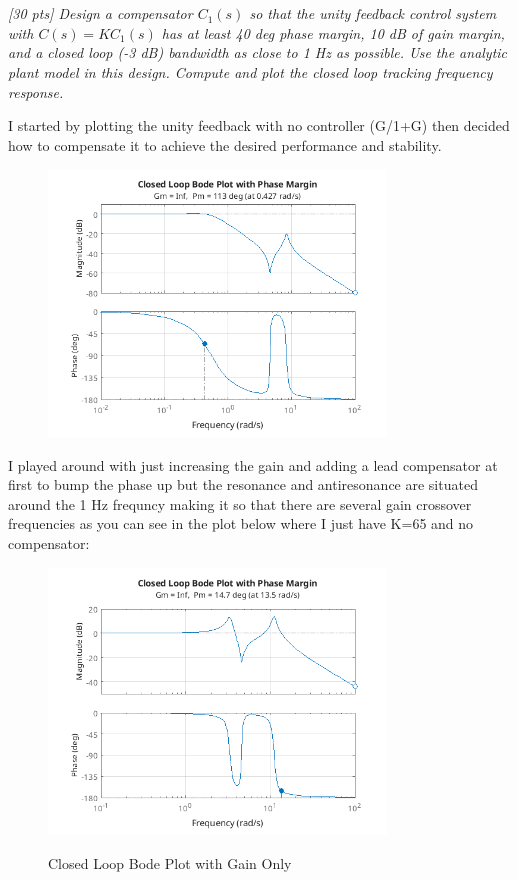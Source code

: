 \documentclass{article}
\begin{document}
\section{}

\textit{[30 pts] Design a compensator \(C_1(s)\) so that the unity feedback control system with \(C(s) = K C_1(s)\) has at least 40 deg phase margin, 10 dB of gain margin, and a closed loop (-3 dB) bandwidth as close to 1 Hz as possible. Use the analytic plant model in this design. Compute and plot the closed loop tracking frequency response.}

I started by plotting the unity feedback with no controller (G/1+G) then decided how to compensate it to achieve the desired performance and stability.

\begin{figure}[H]
    \centering
    \includegraphics[width=0.8\textwidth]{feedbackNoComp.png}
    \label{fig:feedbackNoComp}
\end{figure}

I played around with just increasing the gain and adding a lead compensator at first to bump the phase up but the resonance and antiresonance are situated around the 1 Hz frequncy making it so that there are several gain crossover frequencies as you can see in the plot below where I just have K=65 and no compensator:

\begin{figure}[H]
    \centering
    \includegraphics[width=0.8\textwidth]{feedbackOnlyK.png}
    \label{fig:feedbackOnlyK}
    \caption{Closed Loop Bode Plot with Gain Only}
\end{figure}
\end{document}
